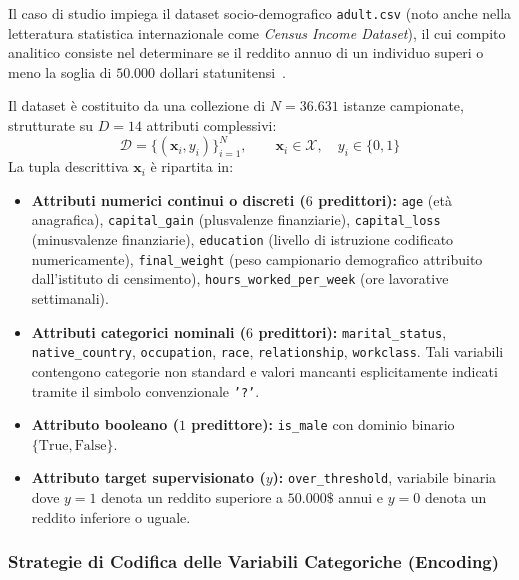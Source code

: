 Il caso di studio impiega il dataset socio-demografico \texttt{adult.csv} (noto anche nella letteratura statistica internazionale come \textit{Census Income Dataset}), il cui compito analitico consiste nel determinare se il reddito annuo di un individuo superi o meno la soglia di $50.000$ dollari statunitensi~\cite{tan2018}.

\begin{definition}
Il dataset è costituito da una collezione di $N = 36.631$ istanze campionate, strutturate su $D = 14$ attributi complessivi:
\begin{equation}
    \mathcal{D} = \{ (\mathbf{x}_i, y_i) \}_{i=1}^N, \qquad \mathbf{x}_i \in \mathcal{X}, \quad y_i \in \{0, 1\}
\end{equation}
La tupla descrittiva $\mathbf{x}_i$ è ripartita in:
\begin{itemize}
    \item \textbf{Attributi numerici continui o discreti ($6$ predittori):} \texttt{age} (età anagrafica), \texttt{capital\_gain} (plusvalenze finanziarie), \texttt{capital\_loss} (minusvalenze finanziarie), \texttt{education} (livello di istruzione codificato numericamente), \texttt{final\_weight} (peso campionario demografico attribuito dall'istituto di censimento), \texttt{hours\_worked\_per\_week} (ore lavorative settimanali).
    \item \textbf{Attributi categorici nominali ($6$ predittori):} \texttt{marital\_status}, \texttt{native\_country}, \texttt{occupation}, \texttt{race}, \texttt{relationship}, \texttt{workclass}. Tali variabili contengono categorie non standard e valori mancanti esplicitamente indicati tramite il simbolo convenzionale \texttt{'?'}.
    \item \textbf{Attributo booleano ($1$ predittore):} \texttt{is\_male} con dominio binario $\{\text{True}, \text{False}\}$.
    \item \textbf{Attributo target supervisionato ($y$):} \texttt{over\_threshold}, variabile binaria dove $y=1$ denota un reddito superiore a $50.000\$$ annui e $y=0$ denota un reddito inferiore o uguale.
\end{itemize}
\end{definition}

\FloatBarrier
\subsubsection{Strategie di Codifica delle Variabili Categoriche (Encoding)}
\label{subsec:dm-lab-encoding}

